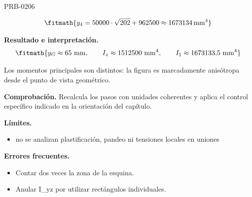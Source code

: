 \begin{studiumworked}{PRB-0206}
\begin{enumerate}
\[\fitmath{y_{4}=50000\cdot \sqrt{202}+962500\approx 1673134\,\mathrm{mm^{4}}}\]

\end{enumerate}

\textbf{Resultado e interpretación.}\[\fitmath{y_G \approx 65\ \mathrm{mm},\qquad I_z \approx 1512500\ \mathrm{mm^4},\qquad I_1 \approx 1673133{,}5\ \mathrm{mm^4}}\]

Los momentos principales son distintos: la figura es marcadamente anisótropa desde el punto de vista geométrico.

\par\textbf{Comprobación.} Recalcula los pasos con unidades coherentes y aplica el control específico indicado en la orientación del capítulo.

\textbf{Límites.}\begin{itemize}\item no se analizan plastificación, pandeo ni tensiones locales en uniones\end{itemize}

\textbf{Errores frecuentes.}\begin{itemize}\item Contar dos veces la zona de la esquina.
\item Anular I\_yz por utilizar rectángulos individuales.\end{itemize}

\end{studiumworked}

\Needspace{.3\textheight}

